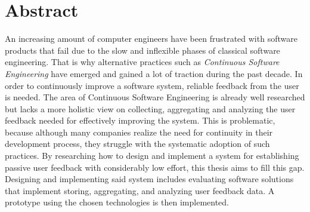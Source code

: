 %
\chapter*{Abstract}
\label{sec:abstract}
\vspace*{-10mm}

An increasing amount of computer engineers have been frustrated with software products that fail due to the slow and inflexible phases of classical software engineering.
That is why alternative practices such as \emph{Continuous Software Engineering} have emerged and gained a lot of traction during the past decade.
In order to continuously improve a software system, reliable feedback from the user is needed.
The area of Continuous Software Engineering is already well researched but lacks a more holistic view on collecting, aggregating and analyzing the user feedback needed for effectively improving the system.
This is problematic, because although many companies realize the need for continuity in their development process, they struggle with the systematic adoption of such practices.
By researching how to design and implement a system for establishing passive user feedback with considerably low effort, this thesis aims to fill this gap.
Designing and implementing said system includes evaluating software solutions that implement storing, aggregating, and analyzing user feedback data.
A prototype using the chosen technologies is then implemented.
